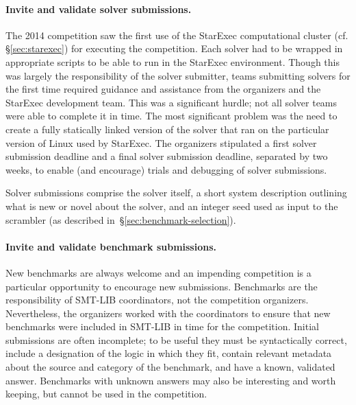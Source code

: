 \documentclass[twoside,11pt]{article}
\begin{document}
\paragraph{Invite and validate solver submissions.} The 2014 competition saw the first use of the StarExec computational cluster (cf. \S\ref{sec:starexec}) for executing the competition. Each solver had to be wrapped in appropriate scripts to be able to run in the StarExec environment. Though this was largely the responsibility of the solver submitter, teams submitting solvers for the first time required guidance and assistance from the organizers and the StarExec development team. This was a significant hurdle; not all solver teams were able to complete it in time. The most significant problem was the need to create a fully statically linked version of the solver that ran on the particular version of Linux used by StarExec. The organizers stipulated a first solver submission deadline and a final solver submission deadline, separated by two weeks, to enable (and encourage) trials and debugging of solver submissions.

Solver submissions comprise the solver itself, a short system
description outlining what is new or novel about the solver, and an
integer seed used as input to the scrambler (as described
in~\S\ref{sec:benchmark-selection}).

\paragraph{Invite and validate benchmark submissions.} New benchmarks are always welcome and an impending competition is a particular opportunity to encourage new submissions. Benchmarks are the responsibility of SMT-LIB coordinators, not the competition organizers. Nevertheless, the organizers worked with the coordinators to ensure that new benchmarks were included in SMT-LIB in time for the competition. Initial submissions are often incomplete; to be useful they must be syntactically correct, include a designation of the logic in which they fit, contain relevant metadata about the source and category of the benchmark, and have a known, validated answer. Benchmarks with unknown answers may also be interesting and worth keeping, but cannot be used in the competition.
\end{document}

